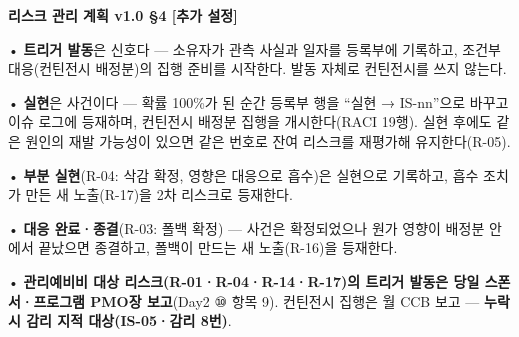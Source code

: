 \documentclass[10pt,a4paper]{article}
\begin{document}
\begin{fieldbox}\small
\ifwbblank
{}
\else
\textbf{리스크 관리 계획 v1.0 §4 [추가 설정]}\par
• \textbf{트리거 발동}은 신호다 — 소유자가 관측 사실과 일자를 등록부에 기록하고, 조건부 대응(컨틴전시 배정분)의 집행 준비를 시작한다. 발동 자체로 컨틴전시를 쓰지 않는다.\par
• \textbf{실현}은 사건이다 — 확률 100\%가 된 순간 등록부 행을 “실현 → IS-nn”으로 바꾸고 이슈 로그에 등재하며, 컨틴전시 배정분 집행을 개시한다(RACI 19행). 실현 후에도 같은 원인의 재발 가능성이 있으면 같은 번호로 잔여 리스크를 재평가해 유지한다(R-05).\par
• \textbf{부분 실현}(R-04: 삭감 확정, 영향은 대응으로 흡수)은 실현으로 기록하고, 흡수 조치가 만든 새 노출(R-17)을 2차 리스크로 등재한다.\par
• \textbf{대응 완료·종결}(R-03: 폴백 확정) — 사건은 확정되었으나 원가 영향이 배정분 안에서 끝났으면 종결하고, 폴백이 만드는 새 노출(R-16)을 등재한다.\par
• \textbf{관리예비비 대상 리스크(R-01·R-04·R-14·R-17)의 트리거 발동은 당일 스폰서·프로그램 PMO장 보고}(Day2 ⑩ 항목 9). 컨틴전시 집행은 월 CCB 보고 — \textbf{누락 시 감리 지적 대상(IS-05·감리 8번)}.
\fi
\end{fieldbox}
\end{document}
